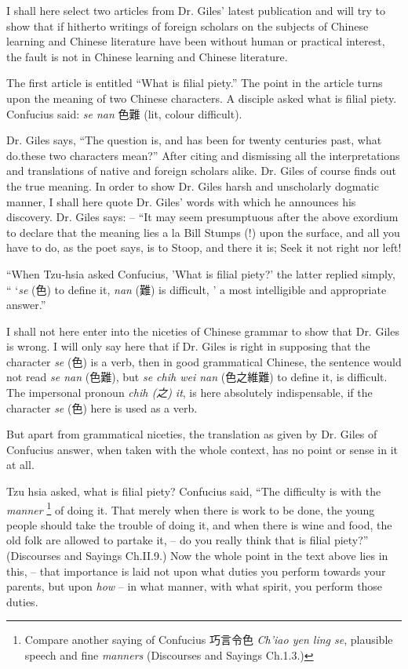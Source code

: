 I shall here select two articles from Dr. Giles' latest publication and will try to show
that if hitherto writings of foreign scholars on the subjects of Chinese learning
and Chinese literature have been without human or practical interest,
the fault is not in Chinese learning and Chinese literature.

The first article is entitled ``What is filial piety.''
The point in the article turns upon the meaning of two Chinese characters.
A disciple asked what is filial piety. Confucius said:
\emph{se nan} 色難  (lit, colour difficult).

Dr. Giles says, ``The question is, and has been for twenty centuries past,
what do.these two characters mean?''
After citing and dismissing all the interpretations and translations of native
and foreign scholars alike.
Dr. Giles of course finds out the true meaning.
In order to show Dr. Giles harsh and unscholarly dogmatic manner,
I shall here quote Dr. Giles' words with which he announces his discovery.
Dr. Giles says: -- 
``It may seem presumptuous after the above exordium to declare
that the meaning lies a la Bill Stumps (!) upon the surface,
and all you have to do, as the poet says, is to
Stoop, and there it is;
Seek it not right nor left!

``When Tzu-hsia asked Confucius, 'What is filial piety?' the latter replied simply,
`` `\emph{se} (色) to define it, \emph{nan} (難) is difficult, ' a most intelligible and appropriate answer.''

I shall not here enter into the niceties of Chinese grammar to show
that Dr. Giles is wrong.
I will only say here that if Dr. Giles is right in supposing that the character \emph{se} (色) is a verb,
then in good grammatical Chinese, the sentence would not read \emph{se nan} (色難),
but \emph{se chih wei nan} (色之維難) to define it, is difficult.
The impersonal pronoun \emph{chih (之) it}, is here absolutely indispensable, if the character \emph{se} (色) here is used as a verb.

But apart from grammatical niceties,
the translation as given by Dr. Giles of Confucius answer,
when taken with the whole context, has no point or sense in it at all.

Tzu hsia asked, what is filial piety?
Confucius said, ``The difficulty is with the \emph{manner}
\footnote{Compare another saying of Confucius 巧言令色 \emph{Ch'iao yen ling se},
plausible speech and fine \emph{manners} (Discourses and Sayings Ch.1.3.)} of doing it.
That merely when there is work to be done,
the young people should take the trouble of doing it,
and when there is wine and food, the old folk are allowed to partake it,
-- do you really think that is filial piety?''
(Discourses and Sayings Ch.II.9.)
Now the whole point in the text above lies in this,
-- that importance is laid not upon what duties you perform towards your parents,
but upon \emph{how} -- in what manner, with what spirit, you perform those duties.

